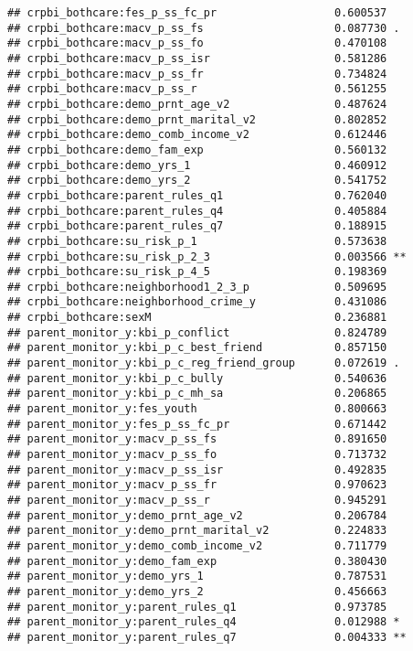 \documentclass[
]{article}
\begin{document}
\begin{verbatim}
## crpbi_bothcare:fes_p_ss_fc_pr                  0.600537    
## crpbi_bothcare:macv_p_ss_fs                    0.087730 .  
## crpbi_bothcare:macv_p_ss_fo                    0.470108    
## crpbi_bothcare:macv_p_ss_isr                   0.581286    
## crpbi_bothcare:macv_p_ss_fr                    0.734824    
## crpbi_bothcare:macv_p_ss_r                     0.561255    
## crpbi_bothcare:demo_prnt_age_v2                0.487624    
## crpbi_bothcare:demo_prnt_marital_v2            0.802852    
## crpbi_bothcare:demo_comb_income_v2             0.612446    
## crpbi_bothcare:demo_fam_exp                    0.560132    
## crpbi_bothcare:demo_yrs_1                      0.460912    
## crpbi_bothcare:demo_yrs_2                      0.541752    
## crpbi_bothcare:parent_rules_q1                 0.762040    
## crpbi_bothcare:parent_rules_q4                 0.405884    
## crpbi_bothcare:parent_rules_q7                 0.188915    
## crpbi_bothcare:su_risk_p_1                     0.573638    
## crpbi_bothcare:su_risk_p_2_3                   0.003566 ** 
## crpbi_bothcare:su_risk_p_4_5                   0.198369    
## crpbi_bothcare:neighborhood1_2_3_p             0.509695    
## crpbi_bothcare:neighborhood_crime_y            0.431086    
## crpbi_bothcare:sexM                            0.236881    
## parent_monitor_y:kbi_p_conflict                0.824789    
## parent_monitor_y:kbi_p_c_best_friend           0.857150    
## parent_monitor_y:kbi_p_c_reg_friend_group      0.072619 .  
## parent_monitor_y:kbi_p_c_bully                 0.540636    
## parent_monitor_y:kbi_p_c_mh_sa                 0.206865    
## parent_monitor_y:fes_youth                     0.800663    
## parent_monitor_y:fes_p_ss_fc_pr                0.671442    
## parent_monitor_y:macv_p_ss_fs                  0.891650    
## parent_monitor_y:macv_p_ss_fo                  0.713732    
## parent_monitor_y:macv_p_ss_isr                 0.492835    
## parent_monitor_y:macv_p_ss_fr                  0.970623    
## parent_monitor_y:macv_p_ss_r                   0.945291    
## parent_monitor_y:demo_prnt_age_v2              0.206784    
## parent_monitor_y:demo_prnt_marital_v2          0.224833    
## parent_monitor_y:demo_comb_income_v2           0.711779    
## parent_monitor_y:demo_fam_exp                  0.380430    
## parent_monitor_y:demo_yrs_1                    0.787531    
## parent_monitor_y:demo_yrs_2                    0.456663    
## parent_monitor_y:parent_rules_q1               0.973785    
## parent_monitor_y:parent_rules_q4               0.012988 *  
## parent_monitor_y:parent_rules_q7               0.004333 ** 

\end{verbatim}
\end{document}
